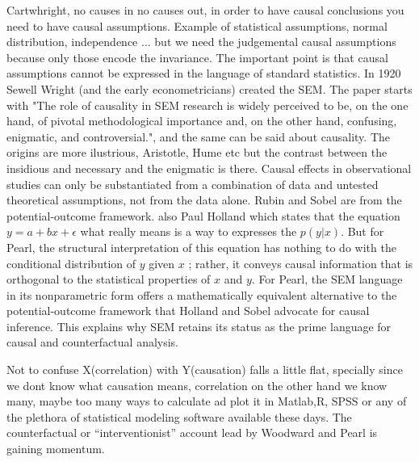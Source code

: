 \documentclass[onecollarge,runningheads]{svjour2}
\begin{document}
Cartwhright, no causes in no causes out, in order to have causal conclusions you need to have causal assumptions. Example of statistical assumptions, normal distribution, independence ... but we need the judgemental causal assumptions because only those encode the invariance.
The important point is that causal assumptions cannot be expressed in the language of standard statistics. In 1920 Sewell Wright (and the early econometricians) created the SEM.
The paper starts with "The role of causality in SEM research is widely perceived to be, on the one hand, of pivotal
methodological importance and, on the other hand, confusing, enigmatic, and controversial.", and the same can be said about causality. The origins are more ilustrious, Aristotle, Hume etc but the contrast between the insidious and necessary and the enigmatic is there. Causal effects in observational studies can only be substantiated from a combination of data and untested theoretical assumptions, not from the data alone.
Rubin and Sobel are from the potential-outcome framework. also Paul Holland which states that the equation $y = a +bx+ \epsilon$ what really means is a way to expresses the $p(y|x)$. But for Pearl, the  structural interpretation of this equation has nothing to do with the conditional distribution of ${y}$ given  ${x}$ ; rather, it conveys causal information that is orthogonal to the statistical properties of  ${x}$  and  ${y}$. For Pearl, the SEM language in its nonparametric form offers a mathematically equivalent alternative to the potential-outcome framework that Holland and Sobel advocate for causal inference. This explains why SEM retains its status as the prime language for causal and counterfactual analysis.

\citep{wiedermann2016statistics}
Not to confuse X(correlation) with Y(causation) falls a little flat, specially since we dont know what causation means, correlation on the other hand we know many, maybe too many ways to calculate ad plot it in Matlab,R, SPSS or any of the plethora of statistical modeling software available these days. 
The counterfactual or “interventionist” account lead by Woodward and Pearl is gaining momentum.
\end{document}
